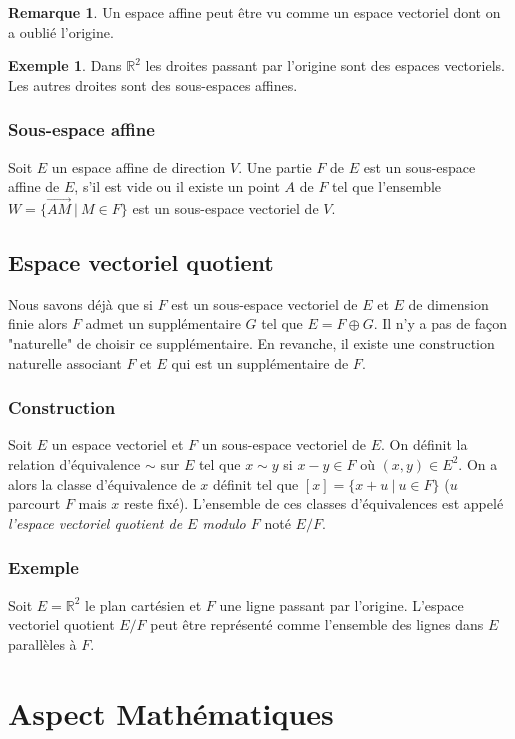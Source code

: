 \documentclass[a4paper,12pt,titlepage]{article}
\theoremstyle{plain}
\theoremstyle{definition}
\newtheorem{rmq}{Remarque}
\newtheorem{ex}{Exemple}
\begin{document}
\begin{rmq}
Un espace affine peut être vu comme un espace vectoriel dont on a oublié l'origine.
\end{rmq}
\begin{ex}
Dans $\mathbb{R}^2$ les droites passant par l'origine sont des espaces vectoriels. Les autres droites sont des sous-espaces affines. 
\end{ex}

\subsubsection{Sous-espace affine}
Soit $E$ un espace affine de direction $V$.
Une partie $F$ de $E$ est un sous-espace affine de $E$, s'il est vide ou il existe un point $A$ de $F$ tel que l'ensemble $W = \{ \overrightarrow{AM}~|~M \in F \}$ est un sous-espace vectoriel de $V$.
\subsection{Espace vectoriel quotient}

Nous savons déjà que si $F$ est un sous-espace vectoriel de $E$ et $E$ de dimension finie alors $F$ admet un supplémentaire $G$ tel que $E = F \oplus G$. Il n'y a pas de façon "naturelle" de choisir ce supplémentaire. En revanche, il existe une construction naturelle associant $F$ et $E$ qui est un supplémentaire de $F$.
\subsubsection{Construction}
Soit $E$ un espace vectoriel et $F$ un sous-espace vectoriel de $E$. On définit la relation d'équivalence $\sim$ sur $E$ tel que $x \sim y$ si $x - y \in F$ où $(x,y)\in E^2$. On a alors la classe d'équivalence de $x$ définit tel que $[x] = \{x + u~|~u \in F\}$ ($u$ parcourt $F$ mais $x$ reste fixé). L'ensemble de ces classes d'équivalences est appelé \emph{l'espace vectoriel quotient de $E$ modulo $F$} noté $E/F$.
\subsubsection{Exemple}
Soit $E = \mathbb{R}^2$ le plan cartésien et $F$ une ligne passant par l'origine.
L'espace vectoriel quotient $E/F$ peut être représenté comme l'ensemble des lignes dans $E$ parallèles à $F$.
\newpage
\section{Aspect Mathématiques}
\end{document}

